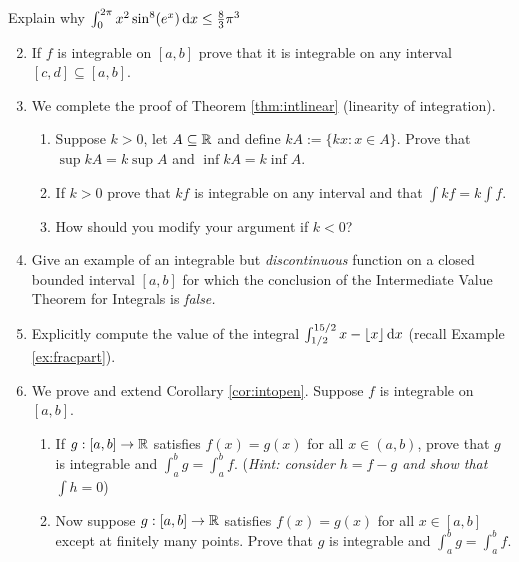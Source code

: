 \vfil

\begin{exercises}
\exstart Explain why $\int_{0}^{2\pi}x^2\sin^8(e^x)\,{\mathrm{d} x} \le\frac 83\pi^3$

\begin{enumerate}\setcounter{enumi}{1}
	\item If $f$ is integrable on $[a,b]$ prove that it is integrable on any interval $[c,d]\subseteq[a,b]$.
	
	\item We complete the proof of Theorem \ref{thm:intlinear} (linearity of integration).
	\begin{enumerate}
  	\item Suppose $k>0$, let $A\subseteq\mathbb{R}$ and define $kA:=\{kx:x\in A\}$. Prove that $\sup kA=k\sup A$ and $\inf kA=k\inf A$.
  	\item If $k>0$ prove that $kf$ is integrable on any interval and that $\int kf=k\int f$.
  	\item How should you modify your argument if $k<0$?
	\end{enumerate}
	
  
  \item Give an example of an integrable but \emph{discontinuous} function on a closed bounded interval $[a,b]$ for which the conclusion of the Intermediate Value Theorem for Integrals is \emph{false.}
  
	\item Explicitly compute the value of the integral $\int_{1/2}^{{15/2}} x-\lfloor x\rfloor \,{\mathrm{d} x}$ (recall Example \ref{ex:fracpart}).
	
	\item\label{exs:extensionlemma} We prove and extend Corollary \ref{cor:intopen}. Suppose $f$ is integrable on $[a,b]$. 
	\begin{enumerate}
	  \item If $g:[a,b]\to\mathbb{R}$ satisfies $f(x)=g(x)$ for all $x\in (a,b)$, prove that $g$ is integrable and $\int_a^bg=\int_a^bf$.\smallbreak
		(\emph{Hint: consider $h=f-g$ and show that $\int h=0$})
		\item Now suppose $g:[a,b]\to\mathbb{R}$ satisfies $f(x)=g(x)$ for all $x\in [a,b]$ except at finitely many points. Prove that $g$ is integrable and $\int_a^bg=\int_a^bf$.
	\end{enumerate}
  

\end{enumerate}
\end{exercises}
